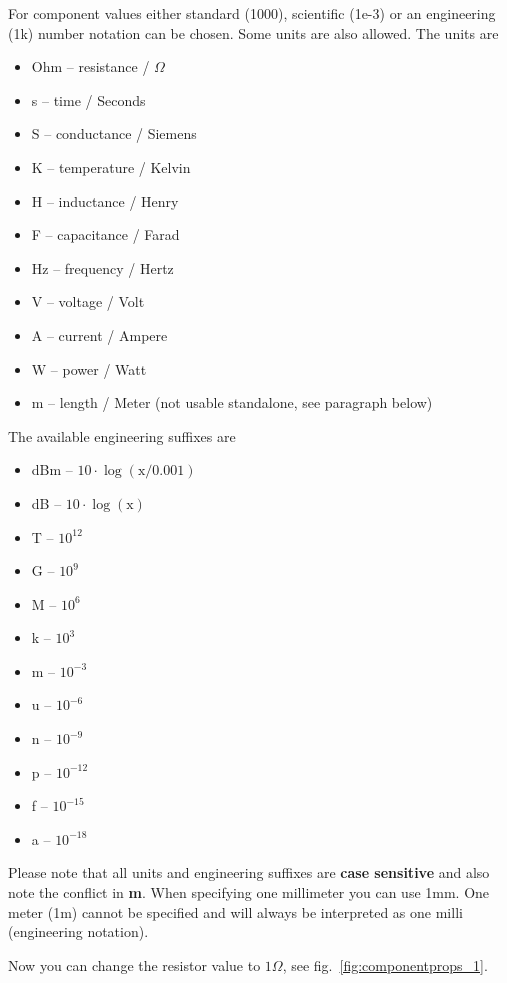 
For component values either standard (1000), scientific (1e-3) or an
engineering (1k) number notation can be chosen.  Some units are also
allowed.  The units are
\begin{itemize}
\item Ohm -- resistance / $\Omega$
\item s -- time / Seconds
\item S -- conductance / Siemens
\item K -- temperature / Kelvin
\item H -- inductance / Henry
\item F -- capacitance / Farad
\item Hz -- frequency / Hertz
\item V -- voltage / Volt
\item A -- current / Ampere
\item W -- power / Watt
\item m -- length / Meter (not usable standalone, see paragraph below)
\end{itemize}

The available engineering suffixes are
\begin{itemize}
\item dBm -- $\mathrm{10\cdot\log{\left(x/0.001\right)}}$
\item dB -- $\mathrm{10\cdot\log{\left(x\right)}}$
\item T -- $10^{12}$
\item G -- $10^{9}$
\item M -- $10^{6}$
\item k -- $10^{3}$
\item m -- $10^{-3}$
\item u -- $10^{-6}$
\item n -- $10^{-9}$
\item p -- $10^{-12}$
\item f -- $10^{-15}$
\item a -- $10^{-18}$
\end{itemize}

Please note that all units and engineering suffixes are \textbf{case
sensitive} and also note the conflict in \textbf{m}.  When specifying
one millimeter you can use 1mm.  One meter (1m) cannot be specified
and will always be interpreted as one milli (engineering notation).

\medskip

Now you can change the resistor value to $1\Omega$, see
fig.~\ref{fig:componentprops_1}.

